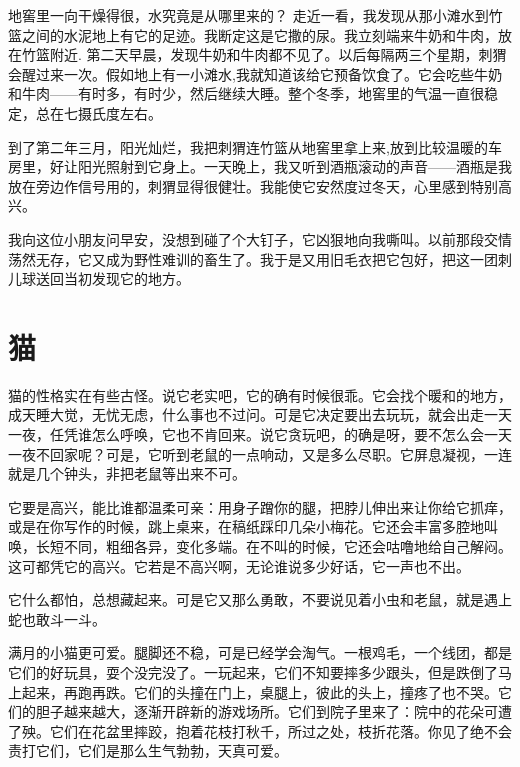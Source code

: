 \documentclass[12pt,UTF-8,openany]{ctexbook}
\begin{document}
\begin{large}
    地窖里一向干燥得很，水究竟是从哪里来的？ 走近一看，我发现从那小滩水到竹篮之间的水泥地上有它的足迹。我断定这是它撒的尿。我立刻端来牛奶和牛肉，放在竹篮附近. 第二天早晨，发现牛奶和牛肉都不见了。以后每隔两三个星期，刺猬会醒过来一次。假如地上有一小滩水,我就知道该给它预备饮食了。它会吃些牛奶和牛肉——有时多，有时少，然后继续大睡。整个冬季，地窖里的气温一直很稳定，总在七摄氏度左右。
    
    到了第二年三月，阳光灿烂，我把刺猬连竹篮从地窖里拿上来,放到比较温暖的车房里，好让阳光照射到它身上。一天晚上，我又听到酒瓶滚动的声音——酒瓶是我放在旁边作信号用的，刺猬显得很健壮。我能使它安然度过冬天，心里感到特别高兴。
    
    我向这位小朋友问早安，没想到碰了个大钉子，它凶狠地向我嘶叫。以前那段交情荡然无存，它又成为野性难训的畜生了。我于是又用旧毛衣把它包好，把这一团刺儿球送回当初发现它的地方。
    
\end{large}



\chapter{猫}

\begin{large}
    
    猫的性格实在有些古怪。说它老实吧，它的确有时候很乖。它会找个暖和的地方，成天睡大觉，无忧无虑，什么事也不过问。可是它决定要出去玩玩，就会出走一天一夜，任凭谁怎么呼唤，它也不肯回来。说它贪玩吧，的确是呀，要不怎么会一天一夜不回家呢？可是，它听到老鼠的一点响动，又是多么尽职。它屏息凝视，一连就是几个钟头，非把老鼠等出来不可。
    
    它要是高兴，能比谁都温柔可亲：用身子蹭你的腿，把脖儿伸出来让你给它抓痒，或是在你写作的时候，跳上桌来，在稿纸踩印几朵小梅花。它还会丰富多腔地叫唤，长短不同，粗细各异，变化多端。在不叫的时候，它还会咕噜地给自己解闷。这可都凭它的高兴。它若是不高兴啊，无论谁说多少好话，它一声也不出。
    
    它什么都怕，总想藏起来。可是它又那么勇敢，不要说见着小虫和老鼠，就是遇上蛇也敢斗一斗。
    
    满月的小猫更可爱。腿脚还不稳，可是已经学会淘气。一根鸡毛，一个线团，都是它们的好玩具，耍个没完没了。一玩起来，它们不知要摔多少跟头，但是跌倒了马上起来，再跑再跌。它们的头撞在门上，桌腿上，彼此的头上，撞疼了也不哭。它们的胆子越来越大，逐渐开辟新的游戏场所。它们到院子里来了：院中的花朵可遭了殃。它们在花盆里摔跤，抱着花枝打秋千，所过之处，枝折花落。你见了绝不会责打它们，它们是那么生气勃勃，天真可爱。
    
\end{large}
\end{document}
